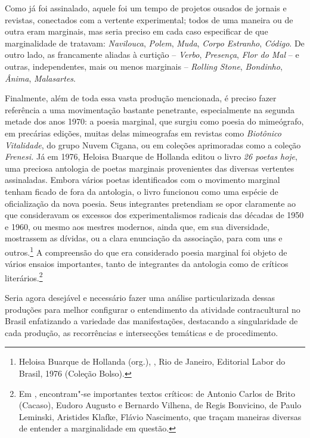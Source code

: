 Como já foi assinalado, aquele foi um tempo de projetos ousados de
jornais e revistas, conectados com a vertente experimental; todos de uma
maneira ou de outra eram marginais, mas seria preciso em cada caso
especificar de que marginalidade de tratavam: \emph{Navilouca},
\emph{Polem}, \emph{Muda}, \emph{Corpo Estranho}, \emph{Código}. De
outro lado, as francamente aliadas à curtição -- \emph{Verbo},
\emph{Presença}, \emph{Flor do Mal} -- e outras, independentes, mais ou
menos marginais -- \emph{Rolling Stone}, \emph{Bondinho}, \emph{Ânima},
\emph{Malasartes}.

Finalmente, além de toda essa vasta produção mencionada, é preciso fazer
referência a uma movimentação bastante penetrante, especialmente na
segunda metade dos anos 1970: a poesia marginal, que surgiu como poesia
do mimeógrafo, em precárias edições, muitas delas mimeografas em
revistas como \emph{Biotônico Vitalidade}, do grupo Nuvem Cigana, ou em
coleções aprimoradas como a coleção \emph{Frenesi.} Já em 1976, Heloisa
Buarque de Hollanda editou o livro \emph{26 poetas hoje}, uma preciosa
antologia de poetas marginais provenientes das diversas vertentes
assinaladas. Embora vários poetas identificados com o movimento marginal
tenham ficado de fora da antologia, o livro funcionou como uma espécie
de oficialização da nova poesia. Seus integrantes pretendiam se opor
claramente ao que consideravam os excessos dos experimentalismos
radicais das décadas de 1950 e 1960, ou mesmo aos mestres modernos,
ainda que, em sua diversidade, mostrassem as dívidas, ou a clara
enunciação da associação, para com uns e outros.\footnote{Heloisa Buarque de Hollanda (org.),
{}, Rio de Janeiro, Editorial Labor do Brasil, 1976 (Coleção Bolso).} A compreensão do que
era considerado poesia marginal foi objeto de vários ensaios
importantes, tanto de integrantes da antologia como de críticos
literários.\footnote{Em {}, encontram"-se
  importantes textos críticos: de Antonio Carlos de Brito (Cacaso),
  Eudoro Augusto e Bernardo Vilhena, de Regis Bonvicino, de Paulo
  Leminski, Aristides Klafke, Flávio Nascimento, que traçam maneiras
  diversas de entender a marginalidade em questão.}

\asterisc

Seria agora desejável e necessário fazer uma análise particularizada
dessas produções para melhor configurar o entendimento da atividade
contracultural no Brasil enfatizando a variedade das manifestações,
destacando a singularidade de cada produção, as recorrências e
intersecções temáticas e de procedimento.


